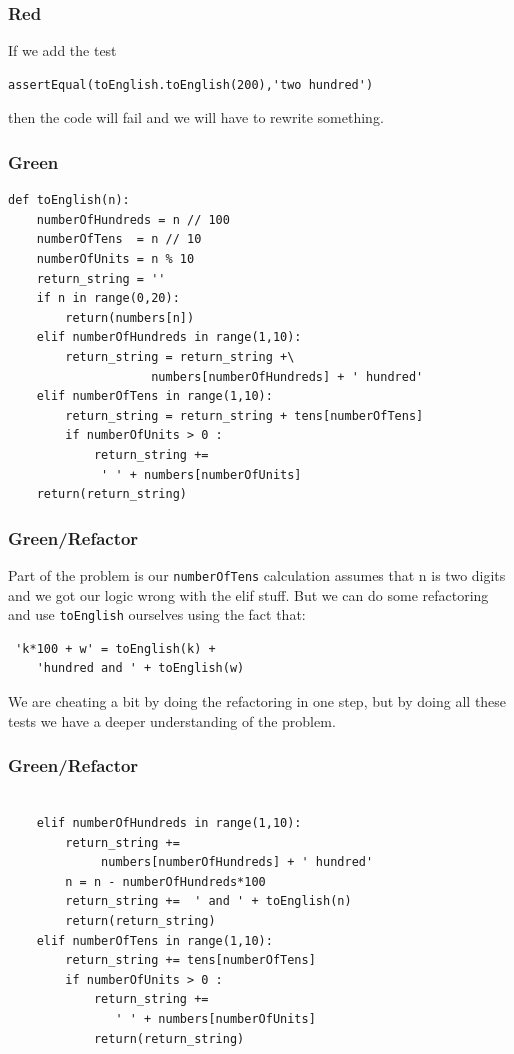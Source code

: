\documentclass{beamer}
\begin{document}
\begin{frame}[fragile]
\frametitle{Red}
If we add the test
\begin{lstlisting}
assertEqual(toEnglish.toEnglish(200),'two hundred')
\end{lstlisting}
then the code will fail and we will have to rewrite something.
\end{frame}
\begin{frame}[fragile]
\frametitle{Green}
\begin{lstlisting}[basicstyle=\fontsize{9}{9}\selectfont]
  def toEnglish(n):
    numberOfHundreds = n // 100
    numberOfTens  = n // 10
    numberOfUnits = n % 10
    return_string = ''
    if n in range(0,20):
        return(numbers[n])
    elif numberOfHundreds in range(1,10):
        return_string = return_string +\
                    numbers[numberOfHundreds] + ' hundred'
    elif numberOfTens in range(1,10):
        return_string = return_string + tens[numberOfTens]
        if numberOfUnits > 0 :
            return_string += 
             ' ' + numbers[numberOfUnits]
    return(return_string)
\end{lstlisting}

\end{frame}
\begin{frame}[fragile]
  \frametitle{Green/Refactor}
Part of the problem is our \texttt{numberOfTens} calculation assumes that n is
two digits and we got our logic wrong with the elif stuff. But we can
do some refactoring and use \texttt{toEnglish} ourselves using the fact that:
\begin{lstlisting}
 'k*100 + w' = toEnglish(k) +
    'hundred and ' + toEnglish(w)  
\end{lstlisting}

We are cheating a bit by doing the refactoring in one step, but by
doing all these tests we have a deeper understanding of the problem.

\end{frame}
\begin{frame}[fragile]
  \frametitle{Green/Refactor}
\begin{lstlisting}

    elif numberOfHundreds in range(1,10):
        return_string += 
             numbers[numberOfHundreds] + ' hundred'
        n = n - numberOfHundreds*100
        return_string +=  ' and ' + toEnglish(n)
        return(return_string)
    elif numberOfTens in range(1,10):
        return_string += tens[numberOfTens]
        if numberOfUnits > 0 :
            return_string += 
               ' ' + numbers[numberOfUnits]
            return(return_string)
  \end{lstlisting}
\end{frame}
\end{document}
